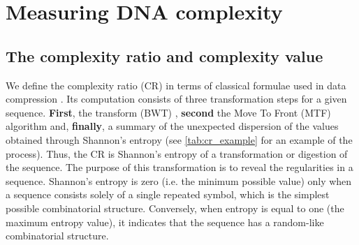 

\section{Measuring DNA complexity}
\label{sec:meas-dna-compl}

\subsection{The complexity ratio and complexity value}
\label{sec:compl-ratio-compl}

We define the complexity ratio (CR) in terms of classical formulae used in data compression \cite{Adjeroh2008}. Its computation consists of three transformation steps for a given sequence. \textbf{First}, the  transform (BWT) \cite{Burrows1994}, \textbf{second} the Move To Front (MTF) \cite{Ryabko1980} algorithm and, \textbf{finally}, a summary of the unexpected dispersion of the values obtained through Shannon's entropy \cite{Shannon1948} (see \autoref{tab:cr_example} for an example of the process). Thus, the CR is Shannon's entropy of a transformation or digestion of the sequence. The purpose of this transformation is to reveal the regularities in a sequence. Shannon's entropy is zero (i.e. the minimum possible value) only when a sequence consists solely of a single repeated symbol, which is the simplest possible combinatorial structure. Conversely, when entropy is equal to one (the maximum entropy value), it indicates that the sequence has a random-like combinatorial structure. 

